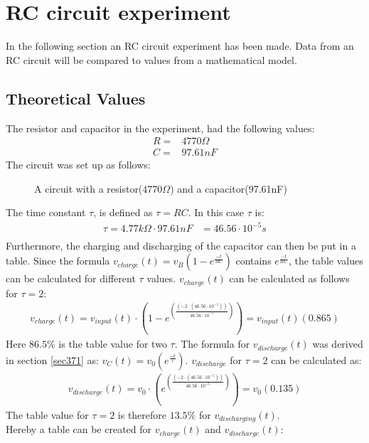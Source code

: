 \section{RC circuit experiment} \label{c: RC_exp}
In the following section an RC circuit experiment has been made. Data from an RC circuit will be compared to values from a mathematical model.

\subsection{Theoretical Values}
The resistor and capacitor in the experiment, had the following values:
\begin{align*}
 R =& 4770\Omega \\
 C =& 97.61nF
\end{align*}
The circuit was set up as follows:
\begin{figure}[H]
	
	\caption{A circuit with a resistor(4770$\Omega$) and a capacitor(97.61nF)}
\end{figure}
\noindent The time constant $\tau$, is defined as $\tau = RC$. In this case $\tau$ is:
\begin{align*}
	\tau = 4.77 k\Omega \cdot 97.61 nF &= 46.56 \cdot 10^{-5} s \\
\end{align*}
Furthermore, the charging and discharging of the capacitor can then be put in a table. Since the formula $v_{charge}(t)=v_B(1-e^{\frac{-t}{RC}})$ contains $e^{\frac{-t}{RC}}$, the table values can be calculated for different $\tau$ values. $v_{charge}(t)$ can be calculated as follows for $\tau = 2$: 
\begin{align*}
v_{charge}(t)=v_{input}(t) \cdot \left(1-e^{\left(\frac{\left(-2 \cdot \left(46.56 \cdot 10^{-5} \right)\right)}{46.56 \cdot 10^{-5}}\right)} \right) = v_{input}(t)(0.865)
\end{align*}
Here $86.5\%$ is the table value for two $\tau$. The formula for $v_{discharge}(t)$ was derived in section \ref{sec371} as: $v_{C}(t)=v_{0} \left(e^{\frac{-t}{\tau}} \right)$. $v_{discharge}$ for $\tau = 2$ can be calculated as:
\begin{align*}
v_{discharge}(t)=v_{0} \cdot \left(e^{\left(\frac{\left(-2 \cdot \left(46.56 \cdot 10^{-5} \right)\right)}{46.56 \cdot 10^{-5}}\right)} \right) = v_{0}(0.135)
\end{align*}
The table value for $\tau = 2$ is therefore $13.5 \%$ for $v_{discharging}(t)$. \\
Hereby a table can be created for $v_{charge}(t)$ and $v_{discharge}(t)$: \\
